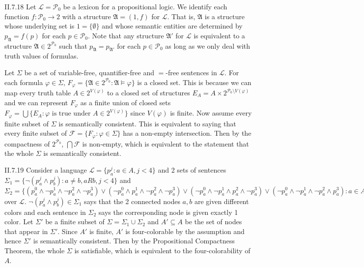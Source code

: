 \documentclass[12pt]{article}
\begin{document}
\begin{customthm}{II.7.18}
  Let $\mathcal{L}=\mathcal{P}_0$ be a lexicon for a propositional logic. We identify each function $f:\mathcal{P}_0\rightarrow2$ with a structure $\mathfrak{A}=(1,f)$ for $\mathcal{L}$. That is, $\mathfrak{A}$ is a structure whose underlying set is $1=\{\emptyset\}$ and whose semantic entities are determined by $p_\mathfrak{A}=f(p)$ for each $p\in\mathcal{P}_0$. Note that any structure $\mathfrak{A}'$ for $\mathcal{L}$ is equivalent to a structure $\mathfrak{A}\in2^{\mathcal{P}_0}$ such that $p_\mathfrak{A}=p_{\mathfrak{A}'}$ for each $p\in\mathcal{P}_0$ as long as we only deal with truth values of formulas.

  Let $\Sigma$ be a set of variable-free, quantifier-free and $=$-free sentences in $\mathcal{L}$. For each formula $\varphi\in\Sigma$, $F_\varphi=\{\mathfrak{A}\in2^{\mathcal{P}_0}:\mathfrak{A}\models\varphi\}$ is a closed set. This is because we can map every truth table $A\in2^{V(\varphi)}$ to a closed set of structures $E_A=A\times2^{\mathcal{P}_0\setminus V(\varphi)}$ and we can represent $F_\varphi$ as a finite union of closed sets $F_\varphi=\bigcup\{E_A:\varphi\text{ is true under }A\in2^{V(\varphi)}\}$ since $V(\varphi)$ is finite. Now assume every finite subset of $\Sigma$ is semantically consistent. This is equivalent to saying that every finite subset of $\mathcal{F}=\{F_\varphi:\varphi\in\Sigma\}$ has a non-empty intersection. Then by the compactness of $2^{\mathcal{P}_0}$, $\bigcap\mathcal{F}$ is non-empty, which is equivalent to the statement that the whole $\Sigma$ is semantically consistent.
\end{customthm}

\begin{customthm}{II.7.19}
  Consider a language $\mathcal{L}=\{p_a^j:a\in A,j<4\}$ and 2 sets of sentences $\Sigma_1=\{\neg(p_a^j\wedge p_b^j):a\neq b,aRb,j<4\}$ and $\Sigma_2=\{(p_a^0\wedge\neg p_a^1\wedge\neg p_a^2\wedge\neg p_a^3)\vee(\neg p_a^0\wedge p_a^1\wedge\neg p_a^2\wedge\neg p_a^3)\vee(\neg p_a^0\wedge\neg p_a^1\wedge p_a^2\wedge\neg p_a^3)\vee(\neg p_a^0\wedge\neg p_a^1\wedge\neg p_a^2\wedge p_a^3):a\in A\}$ over $\mathcal{L}$. $\neg(p_a^j\wedge p_b^j)\in\Sigma_1$ says that the 2 connected nodes $a,b$ are given different colors and each sentence in $\Sigma_2$ says the corresponding node is given exactly 1 color. Let $\Sigma'$ be a finite subset of $\Sigma=\Sigma_1\cup\Sigma_2$ and $A'\subseteq A$ be the set of nodes that appear in $\Sigma'$. Since $A'$ is finite, $A'$ is four-colorable by the assumption and hence $\Sigma'$ is semantically consistent. Then by the Propositional Compactness Theorem, the whole $\Sigma$ is satisfiable, which is equivalent to the four-colorability of $A$.
\end{customthm}
\end{document}
